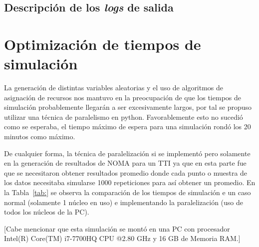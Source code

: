 \subsection{Descripción de los \textit{logs} de salida}

\hfill

\break


\section{Optimización de tiempos de simulación}

La generación de distintas variables aleatorias y el uso de algoritmos de asignación de recursos nos mantuvo en la preocupación de que los tiempos de simulación probablemente llegarán a ser excesivamente largos, por tal se propuso utilizar una técnica de paralelismo en python. Favorablemente esto no sucedió como se esperaba, el tiempo máximo de espera para una simulación rondó los 20 minutos como máximo.\newline

De cualquier forma, la técnica de paralelización si se implementó pero solamente en la generación de resultados de NOMA para un TTI ya que en esta parte fue que se necesitaron obtener resultados promedio donde cada punto o muestra de los datos necesitaba simularse 1000 repeticiones para así obtener un promedio. En la Tabla~\ref{tab:} se observa la comparación de los tiempos de simulación e un caso normal (solamente 1 núcleo en uso) e implementando la paralelización (uso de todos los núcleos de la PC).\newline

[Cabe mencionar que esta simulación se montó en una PC con procesador Intel(R) Core(TM) i7-7700HQ CPU @2.80 GHz y 16 GB de Memoria RAM.]

